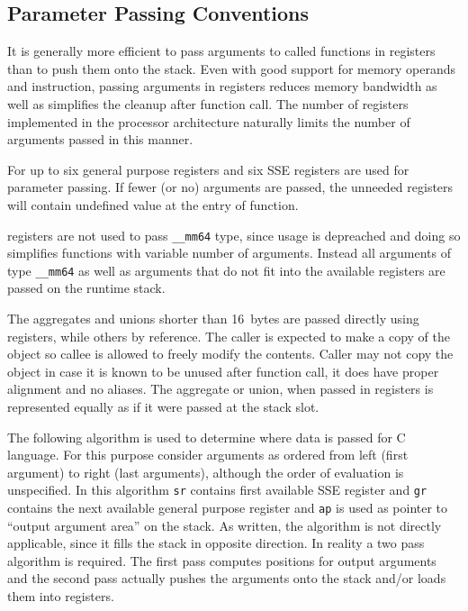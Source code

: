 \subsection{Parameter Passing Conventions}

It is generally more efficient to pass arguments to called functions
in registers than to push them onto the stack. Even with good support
for memory operands and  instruction, passing arguments in
registers reduces memory bandwidth as well as simplifies the cleanup
after function call.  The number of registers implemented in the
processor architecture naturally limits the number of arguments passed
in this manner.

For \xARCH up to six general purpose registers and six SSE registers are used
for parameter passing.  If fewer (or no) arguments are passed, the unneeded registers
will contain undefined value at the entry of function.

\MMX{} registers are not used to pass \verb|__mm64| type, since \MMX{}
usage is depreached and doing so simplifies functions with variable
number of arguments.  Instead all arguments of type \verb|__mm64| as
well as arguments that do not fit into the available registers are
passed on the runtime stack.

The aggregates and unions shorter than 16~bytes are passed directly
using registers, while others by reference.  The caller is expected to
make a copy of the object so callee is allowed to freely modify the
contents.  Caller may not copy the object in case it is known to be
unused after function call, it does have proper alignment and no
aliases. The aggregate or union, when passed in registers is
represented equally as if it were passed at the stack slot.

The following algorithm is used to determine where data is passed for
C language.  For this purpose consider arguments as ordered from left
(first argument) to right (last arguments), although the order of
evaluation is unspecified. In this algorithm \verb|sr| contains first
available SSE register and \verb|gr| contains the next available
general purpose register and \verb|ap| is used as pointer to ``output
argument area'' on the stack.  As written, the algorithm is not
directly applicable, since it fills the stack in opposite direction.
In reality a two pass algorithm is required.  The first pass computes
positions for output arguments and the second pass actually pushes the
arguments onto the stack and/or loads them into registers.


